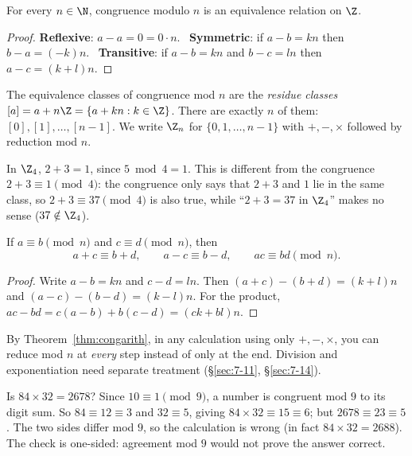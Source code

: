 \begin{proposition}
\label{thm:congequiv}
For every $n\in\N$, congruence modulo $n$ is an equivalence relation on $\Z$.
\end{proposition}
\begin{proof}
\textbf{Reflexive}: $a-a=0=0\cdot n$. \ \textbf{Symmetric}: if $a-b=kn$ then $b-a=(-k)n$. \ \textbf{Transitive}: if $a-b=kn$ and $b-c=ln$ then $a-c=(k+l)n$.
\end{proof}

\begin{definition}
The equivalence classes of congruence mod $n$ are the \emph{residue classes} $[a]=a+n\Z=\{a+kn : k\in\Z\}$. There are exactly $n$ of them: $[0],[1],\dots,[n-1]$. We write $\Z_n$ for $\{0,1,\dots,n-1\}$ with $+,-,\times$ followed by reduction mod $n$.
\end{definition}

\begin{note}
In $\Z_4$, $2+3=1$, since $5\bmod4=1$. This is different from the congruence $2+3\equiv1\pmod4$: the congruence only says that $2+3$ and $1$ lie in the same class, so $2+3\equiv37\pmod4$ is also true, while ``$2+3=37$ in $\Z_4$'' makes no sense ($37\notin\Z_4$).
\end{note}

\begin{theorem}
\label{thm:congarith}
If $a\equiv b\pmod n$ and $c\equiv d\pmod n$, then
\[
a+c\equiv b+d, \qquad a-c\equiv b-d, \qquad ac\equiv bd \pmod n.
\]
\end{theorem}
\begin{proof}
Write $a-b=kn$ and $c-d=ln$. Then $(a+c)-(b+d)=(k+l)n$ and $(a-c)-(b-d)=(k-l)n$. For the product, $ac-bd = c(a-b)+b(c-d) = (ck+bl)n$.
\end{proof}

\begin{note}
By Theorem~\ref{thm:congarith}, in any calculation using only $+,-,\times$, you can reduce mod $n$ at \emph{every} step instead of only at the end. Division and exponentiation need separate treatment (\S\ref{sec:7-11}, \S\ref{sec:7-14}).
\end{note}

\begin{example}
Is $84\times32=2678$? Since $10\equiv1\pmod9$, a number is congruent mod $9$ to its digit sum. So $84\equiv12\equiv3$ and $32\equiv5$, giving $84\times32\equiv15\equiv6$; but $2678\equiv23\equiv5$. The two sides differ mod $9$, so the calculation is wrong (in fact $84\times32=2688$). The check is one-sided: agreement mod $9$ would not prove the answer correct.
\end{example}

